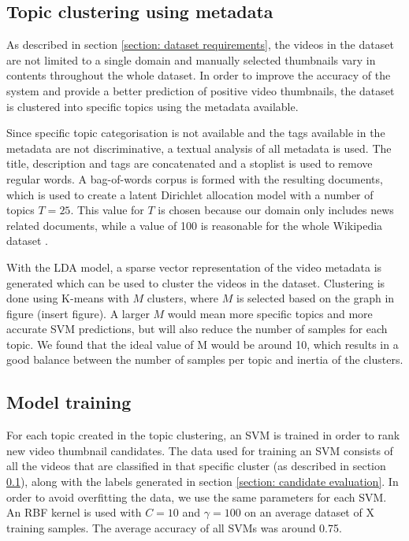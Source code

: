 \documentclass{../resources/sig-alternate-05-2015}
\begin{document}
\subsection{Topic clustering using metadata}
\label{topic clustering}

As described in section \ref{section: dataset requirements}, the videos in the dataset are not limited to a single domain and manually selected thumbnails vary in contents throughout the whole dataset. In order to improve the accuracy of the system and provide a better prediction of positive video thumbnails, the dataset is clustered into specific topics using the metadata available.

Since specific topic categorisation is not available and the tags available in the metadata are not discriminative, a textual analysis of all metadata is used. The title, description and tags are concatenated and a stoplist is used to remove regular words. A bag-of-words corpus is formed with the resulting documents, which is used to create a latent Dirichlet allocation model with a number of topics $T = 25$. This value for $T$ is chosen because our domain only includes news related documents, while a value of 100 is reasonable for the whole Wikipedia dataset \cite{Newman:2009uk,Blei:2003tn}.

With the LDA model, a sparse vector representation of the video metadata is generated which can be used to cluster the videos in the dataset. Clustering is done using K-means with $M$ clusters, where $M$ is selected based on the graph in figure (insert figure). A larger $M$ would mean more specific topics and more accurate SVM predictions, but will also reduce the number of samples for each topic. We found that the ideal value of M would be around 10, which results in a good balance between the number of samples per topic and inertia of the clusters.


\subsection{Model training}
\label{section: model training}

For each topic created in the topic clustering, an SVM is trained in order to rank new video thumbnail candidates. The data used for training an SVM consists of all the videos that are classified in that specific cluster (as described in section \ref{topic clustering}), along with the labels generated in section \ref{section: candidate evaluation}. In order to avoid overfitting the data, we use the same parameters for each SVM. An RBF kernel is used with $C = 10$ and $\gamma = 100$ on an average dataset of X training samples. The average accuracy of all SVMs was around 0.75.
\end{document}
